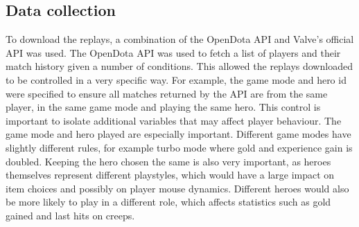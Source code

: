 \documentclass[Report.tex]{subfiles}
\begin{document}

\subsection{Data collection}\label{sec:data-collection}
To download the replays, a combination of the OpenDota \cite{opendota} API and Valve's official API was used. The OpenDota API was used to fetch a list of players and their match history given a number of conditions. This allowed the replays downloaded to be controlled in a very specific way. For example, the game mode and hero id were specified to ensure all matches returned by the API are from the same player, in the same game mode and playing the same hero. This control is important to isolate additional variables that may affect player behaviour. The game mode and hero played are especially important. Different game modes have slightly different rules, for example turbo mode where gold and experience gain is doubled. Keeping the hero chosen the same is also very important, as heroes themselves represent different playstyles, which would have a large impact on item choices and possibly on player mouse dynamics. Different heroes would also be more likely to play in a different role, which affects statistics such as gold gained and last hits on creeps. 
\end{document}
